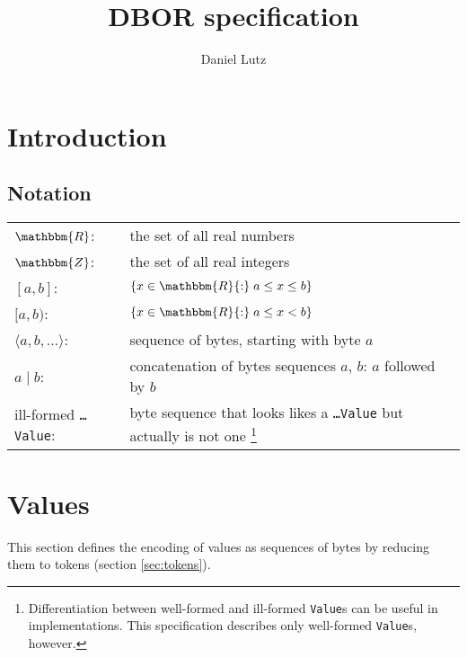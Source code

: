 \documentclass[headings=normal, headsepline, numbers=noenddot, fleqn, a4paper]{scrartcl}
\title{DBOR specification \DborVersion}
\author{Daniel Lutz}
\newcommand{\DborSyntaxIdent}[1]{\texttt{#1}}
\begin{document}
    \maketitle
    \tableofcontents

    \section{Introduction}

    \subsection{Notation}

    \noindent
    {%
        \setlength\extrarowheight{0.8ex}%
        \begin{tabular}{@{} p{} p{}}
            $\mathbbm{R}$: & 
                the set of all real numbers \\
            $\mathbbm{Z}$: & 
                the set of all real integers \\
            $[a, b]$: & 
                $\{x \in \mathbbm{R}{:}\; a \le x \le b\}$ \\
            $[a, b)$: &
                $\{x \in \mathbbm{R}{:}\; a \le x < b\}$ \\
            $\langle a, b, \ldots\rangle$: & 
                sequence of bytes, starting with byte $a$ \\
            $a \mid b$: & 
                concatenation of bytes sequences $a$, $b$: $a$ followed by $b$ \\
            ill-formed \DborSyntaxIdent{\dots Value}: & 
                byte sequence that looks likes a \DborSyntaxIdent{\dots Value} but actually
                is not one%
                \footnote{
                    Differentiation between well-formed and ill-formed \DborSyntaxIdent{Value}s 
                    can be useful in implementations.
                    This specification describes only well-formed \DborSyntaxIdent{Value}s, however.
                } \\             
        \end{tabular}%
    }


    \section{Values}
    \label{sec:values}

    This section defines the encoding of values as sequences of bytes by reducing them to tokens
    (section \ref{sec:tokens}).
\end{document}

